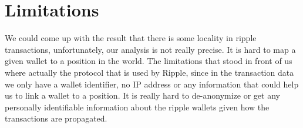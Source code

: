 \section{Limitations}
We could come up with the result that there is some locality in ripple transactions, unfortunately, our analysis is not really precise. It is hard to map a given wallet to a position in the world.
The limitations that stood in front of us where actually the protocol that is used by Ripple, since in the transaction data we only have a wallet identifier, no IP address or any information that could help us to link a wallet to a position. It is really hard to de-anonymize or get any personally identifiable information about the ripple wallets given how the transactions are propagated.